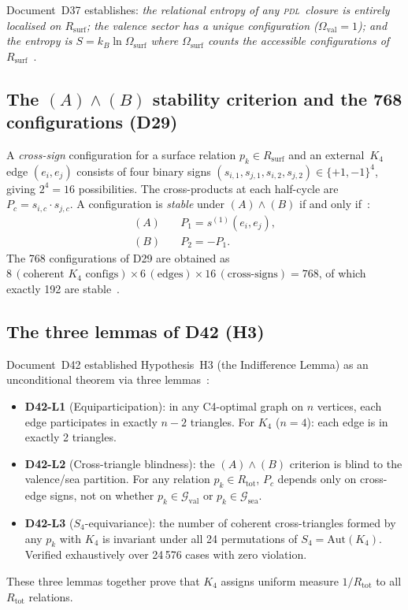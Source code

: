 \documentclass[12pt,a4paper]{article}
\newcommand{\Kfour}{K_4}
\newcommand{\PDL}{\textsc{pdl}}
\newcommand{\Rsurf}{R_{\mathrm{surf}}}
\newcommand{\Rtot}{R_{\mathrm{tot}}}
\newcommand{\Gval}{\mathcal{G}_{\mathrm{val}}}
\newcommand{\Gsea}{\mathcal{G}_{\mathrm{sea}}}
\newcommand{\Omegasurf}{\Omega_{\mathrm{surf}}}
\begin{document}
Document~D37 establishes: \emph{the relational entropy of any \PDL\ closure is entirely localised on $\Rsurf$; the valence sector has a unique configuration ($\Omega_{\mathrm{val}} = 1$); and the entropy is $S = k_B \ln\Omegasurf$ where $\Omegasurf$ counts the accessible configurations of $\Rsurf$}~\cite{PDL_D37_2026}.

\subsection{The \texorpdfstring{$(A)\wedge(B)$}{(A)∧(B)} stability criterion and the 768 configurations (D29)}

A \emph{cross-sign} configuration for a surface relation $p_k \in \Rsurf$ and an external~$\Kfour$ edge $(e_i, e_j)$ consists of four binary signs $(s_{i,1}, s_{j,1}, s_{i,2}, s_{j,2}) \in \{+1,-1\}^4$, giving $2^4 = 16$ possibilities. The cross-products at each half-cycle are $P_c = s_{i,c}\cdot s_{j,c}$. A configuration is \emph{stable} under $(A)\wedge(B)$ if and only if~\cite{PDL_D29_2026}:
\begin{align}
(A) &\quad P_1 = s^{(1)}(e_i, e_j), \label{eq:condA} \\
(B) &\quad P_2 = -P_1. \label{eq:condB}
\end{align}
The 768 configurations of D29 are obtained as $8\,(\text{coherent } \Kfour\text{ configs}) \times 6\,(\text{edges}) \times 16\,(\text{cross-signs}) = 768$, of which exactly 192 are stable~\cite{PDL_D29_2026}.

\subsection{The three lemmas of D42 (H3)}

Document~D42 established Hypothesis~H3 (the Indifference Lemma) as an unconditional theorem via three lemmas~\cite{PDL_D42_2026}:
\begin{itemize}[leftmargin=2em]
\item \textbf{D42-L1} (Equiparticipation): in any C4-optimal graph on $n$ vertices, each edge participates in exactly $n-2$ triangles. For $\Kfour$ ($n=4$): each edge is in exactly 2 triangles.
\item \textbf{D42-L2} (Cross-triangle blindness): the $(A)\wedge(B)$ criterion is blind to the valence/sea partition. For any relation $p_k \in \Rtot$, $P_c$ depends only on cross-edge signs, not on whether $p_k \in \Gval$ or $p_k \in \Gsea$.
\item \textbf{D42-L3} ($S_4$-equivariance): the number of coherent cross-triangles formed by any $p_k$ with $\Kfour$ is invariant under all 24 permutations of $S_4 = \mathrm{Aut}(\Kfour)$. Verified exhaustively over 24\,576 cases with zero violation.
\end{itemize}
These three lemmas together prove that $\Kfour$ assigns uniform measure $1/\Rtot$ to all $\Rtot$ relations.
\end{document}
